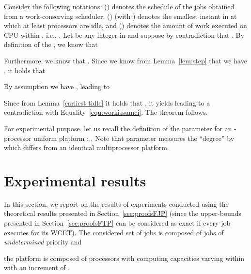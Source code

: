 \documentclass[10pt,english,a4paper]{article}
\newenvironment{proof}[1][Proof]{\begin{trivlist}
\item[\hskip \labelsep {\bfseries #1}]}{\end{trivlist}}
\newtheorem{validity test}{Validity Test}
\newcommand{\fin}{\hfill{\small }}     \newcommand{\oh}[1]{\ensuremath{\mathcal{0}{(#1)}}} \def\thefootnote{\arabic{footnote}}
\begin{document}
\begin{proof}
Consider the following notations: ()  denotes the schedule of the  jobs obtained from a work-conserving  scheduler; ()  (with ) denotes the smallest instant in  at which at least  processors are idle, and ()  denotes the amount of work executed on CPU  within , i.e., . Let  be any integer in  and suppose by contradiction that . By definition of the , we know that 

Furthermore, we know that . Since we know from Lemma~\ref{lem:step} that we have  , it holds that

By assumption we have , leading to
\begin{small}

\end{small}
Since from Lemma~\ref{earliest tidle} it holds that  , it yields  leading to a contradiction with Equality~\ref{equ:workissumci}. The theorem follows. \fin
\end{proof}



For experimental purpose, let us recall the definition of the parameter  \cite{SGB2001} for an -processor uniform platform : . Note that parameter  measures the ``degree'' by which  differs from an identical multiprocessor platform. 



\section{Experimental results}\label{Experimental results}

In this section, we report on the results of experiments conducted using the theoretical results presented in Section~\ref{sec:proofsFJP} (since the upper-bounds presented in Section~\ref{sec:proofsFTP} can be considered as exact if every job executes for its WCET).
The considered set of jobs  is composed of  jobs of \emph{undetermined} priority and \begin{comment}
\begin{table}[!h]
\centering
\begin{tabular}{| c | c | c | c | c |}
\hline
\multicolumn{5}{| c |}{\textbf{Job WCETs}} \\
\hline
 &  &  &  &  \\
\hline
3896 & 3964 & 878 & 1378 & 2228 \\
\hline
 &  &  &  &  \\
\hline
3612 & 1230 & 1232 & 1668 & 4672 \\
\hline
\end{tabular}
\caption{WCET of the considered jobs}
\label{tab:parameters}
\end{table}
\end{comment}
the platform  is composed of  processors with computing capacities varying within  with an increment of . 
\end{document}
